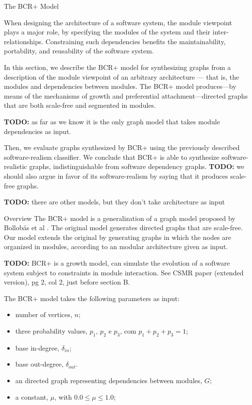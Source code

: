 \documentclass[11pt,twocolumn,a4paper,english]{article}
\newcommand{\TODO}{\textbf{TODO:} }
\begin{document}
\begin{section}{The BCR+ Model}	
	\newcommand{\din}[0]{\ensuremath{\delta_{in}}}
	\newcommand{\dout}[0]{\ensuremath{\delta_{out}}}
	\newcommand{\gin}[0]{\ensuremath{\mathrm{d}_{in}}}
	\newcommand{\gout}[0]{\ensuremath{\mathrm{d}_{out}}}
	
	When designing the architecture of a software system, the module viewpoint plays a major role, by specifying the modules of the system and their inter-relationships. Constraining such dependencies benefits the maintainability, portability, and reusability of the software system.
	
	In this section, we describe the BCR+ model for synthesizing graphs from a description of the module viewpoint of an arbitrary architecture --- that is, the modules and dependencies between modules. The BCR+ model produces---by means of the mechanisms of growth and preferential attachment---directed graphs that are both scale-free and segmented in modules.
	
	\TODO as far as we know it is the only graph model that takes module dependencies as input.
	
	Then, we evaluate graphs synthesized by BCR+ using the previously described software-realism classifier. We conclude that BCR+ is able to synthesize software-realistic graphs, indistinguishable from software dependency graphs. \TODO we should also argue in favor of its software-realism by saying that it produces scale-free graphs.
	
	\TODO there are other models, but they don't take architecture as input	
	
\begin{subsection}{Overview}
	The BCR+ model is a generalization of a graph model proposed by Bollobás et al \cite{Bollobas2003}. The original model generates directed graphs that are scale-free. Our model extends the original by generating graphs in which the nodes are organized in modules, according to an modular architecture given as input.
	
	\TODO BCR+ is a growth model, can simulate the evolution of a software system subject to constraints in module interaction. See CSMR paper (extended version), pg 2, col 2, just before section B. 
	
	The BCR+ model takes the following parameters as input:
	
	\begin{itemize}
  \item number of vertices, $n$;
  \item three probability values, $p_1$, $p_2$ e $p_3$, com $p_1 + p_2 + p_3 = 1$;
  \item base in-degree, $\din$;
  \item base out-degree, $\dout$.
  \item an directed graph representing dependencies between modules, $G$;
  \item a constant, $\mu$, with $0.0 \le \mu \le 1.0$;
  \end{itemize}
  

\end{subsection}
\end{section}
\end{document}

